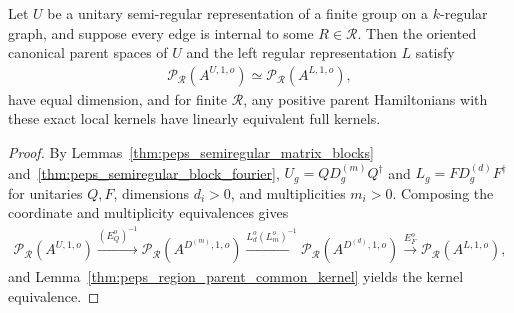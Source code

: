 \begin{lemma}%
    \label{thm:peps_oriented_semiregular_canonical_parent}
    \leanok
    Let $U$ be a unitary semi-regular representation of a finite group on a $k$-regular graph, and suppose every edge is internal to some $R\in\mathcal R$. Then the oriented canonical parent spaces of $U$ and the left regular representation $L$ satisfy
    \begin{align}
        \mathcal P_{\mathcal R}(A^{U,1,o})
        \simeq\mathcal P_{\mathcal R}(A^{L,1,o}),
        \label{eq:peps_oriented_semiregular_parent}
    \end{align}
    have equal dimension, and for finite $\mathcal R$, any positive parent Hamiltonians with these exact local kernels have linearly equivalent full kernels.
\end{lemma}
\begin{proof}\leanok
    By Lemmas~\ref{thm:peps_semiregular_matrix_blocks} and~\ref{thm:peps_semiregular_block_fourier}, $U_g=QD^{(m)}_gQ^\dagger$ and $L_g=FD^{(d)}_gF^\dagger$ for unitaries $Q,F$, dimensions $d_i>0$, and multiplicities $m_i>0$. Composing the coordinate and multiplicity equivalences gives
    \begin{align}
        \mathcal P_{\mathcal R}(A^{U,1,o})
        \xrightarrow{(E_Q^o)^{-1}}
        \mathcal P_{\mathcal R}(A^{D^{(m)},1,o})
        \xrightarrow{L_d^o(L_m^o)^{-1}}
        \mathcal P_{\mathcal R}(A^{D^{(d)},1,o})
        \xrightarrow{E_F^o}\mathcal P_{\mathcal R}(A^{L,1,o}),
        \label{eq:peps_oriented_semiregular_composition}
    \end{align}
    and Lemma~\ref{thm:peps_region_parent_common_kernel} yields the kernel equivalence.
\end{proof}

